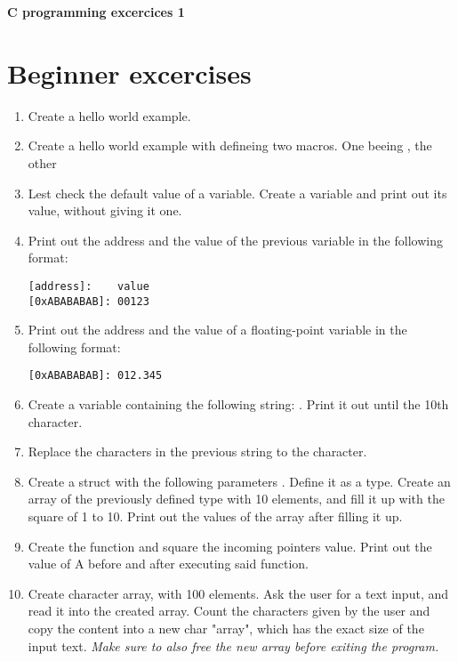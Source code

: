 \documentclass[12pt,a4paper]{article}
\author{Korcsák Gergely}
\begin{document}
    \setcounter{page}{1} %
    \setalgorithmcounter %

	{
        \centering
        {\Large \textbf{C programming excercices 1} }\\ \vspace{.5em}\hline
		\vspace{2em}
	}


    \section{Beginner excercises}
    \begin{enumerate}
        \item Create a hello world example.
        \item Create a hello world example with defineing two macros. One beeing , the other 
        \item Lest check the default value of a variable. Create a variable and print out its value, without giving it one.
        \item Print out the address and the value of the previous variable in the following format:
              \begin{lstlisting}[style=CStyle]
[address]:    value
[0xABABABAB]: 00123
\end{lstlisting}
        \item Print out the address and the value of a floating-point variable in the following format:
              \begin{lstlisting}[style=CStyle]
[0xABABABAB]: 012.345
\end{lstlisting}
        \item Create a variable containing the following string: . Print it out until
              the 10th character.
        \item Replace the  characters in the previous string to the  character.
        \item Create a struct with the following parameters . Define it as a type.
              Create an array of the previously defined type with 10 elements, and fill it up with the square of 1 to 10.
              Print out the values of the array after filling it up.
        \item Create the function  and square the incoming pointers value.
              Print out the value of A before and after executing said function.
        \item Create character array, with 100 elements. Ask the user for a text input, and read it into the created array.
              Count the characters given by the user and copy the content into a new char "array", which has the exact
              size of the input text. \textit{Make sure to also free the new array before exiting the program.}
    \end{enumerate}
\end{document}
